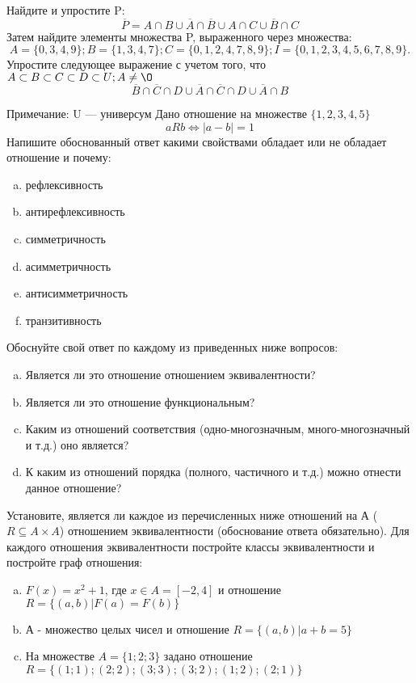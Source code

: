 \documentclass[10pt]{exam}
\begin{document}
\begin{questions}
\question
Найдите и упростите P:
\begin{equation*}
\overline{P} = A \cap B \cup \overline{A} \cap \overline{B} \cup A \cap C \cup \overline{B} \cap C
\end{equation*}
Затем найдите элементы множества P, выраженного через множества:
\begin{equation*}
A = \{0, 3, 4, 9\}; 
B = \{1, 3, 4, 7\};
C = \{0, 1, 2, 4, 7, 8, 9\};
I = \{0, 1, 2, 3, 4, 5, 6, 7, 8, 9\}.
\end{equation*}\question
Упростите следующее выражение с учетом того, что $A\subset B \subset C \subset D \subset U; A \neq \O$
\begin{equation*}
\overline{B} \cap \overline{C} \cap D \cup \overline{A} \cap \overline{C} \cap D \cup \overline{A} \cap B
\end{equation*}

Примечание: U — универсум\question
Дано отношение на множестве $\{1, 2, 3, 4, 5\}$ 
\begin{equation*}
aRb \iff |a-b| = 1
\end{equation*}
Напишите обоснованный ответ какими свойствами обладает или не обладает отношение и почему:   
\begin{enumerate} [a)]\setcounter{enumi}{0}
\item рефлексивность
\item антирефлексивность
\item симметричность
\item асимметричность
\item антисимметричность
\item транзитивность
\end{enumerate}

Обоснуйте свой ответ по каждому из приведенных ниже вопросов:
\begin{enumerate} [a)]\setcounter{enumi}{0}
    \item Является ли это отношение отношением эквивалентности?
    \item Является ли это отношение функциональным?
    \item Каким из отношений соответствия (одно-многозначным, много-многозначный и т.д.) оно является?
    \item К каким из отношений порядка (полного, частичного и т.д.) можно отнести данное отношение?
\end{enumerate}

\question
Установите, является ли каждое из перечисленных ниже отношений на А ($R \subseteq A \times A$) отношением эквивалентности (обоснование ответа обязательно). Для каждого отношения эквивалентности постройте классы эквивалентности и постройте граф отношения:
\begin{enumerate} [a)]\setcounter{enumi}{0}
\item $F(x)=x^{2}+1$, где $x \in A = [-2, 4]$ и отношение $R = \{(a,b)|F(a) = F(b)\}$
\item А - множество целых чисел и отношение $R = \{(a,b)|a + b = 5\}$
\item На множестве $A = \{1; 2; 3\}$ задано отношение $R = \{(1; 1); (2; 2); (3; 3); (3; 2); (1; 2); (2; 1)\}$


\end{enumerate}
\end{questions}
\end{document}
